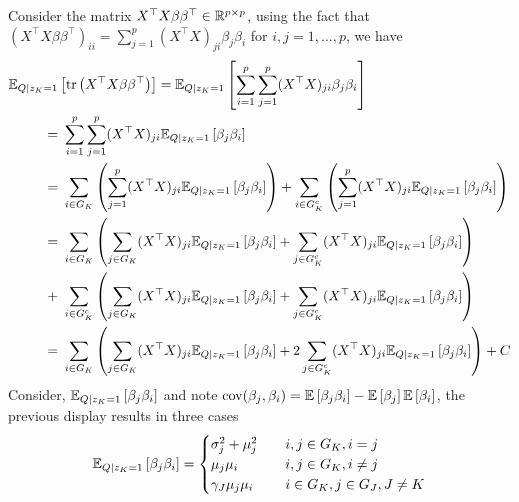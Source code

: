 \documentclass[12pt]{article}
\begin{document}
Consider the matrix $ X^\top X \beta \beta^\top \in \mathbb{R}^{p \times p} $, using the fact that $\left( X^\top X \beta \beta^\top \right)_{ii} = \sum_{j=1}^{p} (X^\top X)_{ji} \beta_j \beta_i $ for $i,j = 1, \dots, p$, we have
\begin{align}
    \E_{Q | z_K = 1} & \left[ 
	\tr \left( X^\top X \beta \beta^\top \right) 
    \right]
=
    \E_{Q | z_K = 1} \left[ 
	\sum_{i=1}^p \sum_{j=1}^{p} (X^\top X)_{ji} \beta_j \beta_i 
    \right] \nonumber \\
=&\
    \sum_{i=1}^p \sum_{j=1}^{p} (X^\top X)_{ji} 
    \E_{Q | z_K = 1} \left[ \beta_j \beta_i \right] 
    \nonumber \\
=&\
    \sum_{i \in G_K} \left(
	\sum_{j=1}^{p} (X^\top X)_{ji} 
	\E_{Q | z_K = 1} \left[ \beta_j \beta_i \right]
    \right)
+
    \sum_{i \in G_K^c} \left(
	\sum_{j=1}^{p} (X^\top X)_{ji} 
	\E_{Q | z_K = 1} \left[ \beta_j \beta_i \right] 
    \right)
    \nonumber \\
=&\
    \sum_{i \in G_K} \left( 
	\sum_{j \in G_K} (X^\top X)_{ji} 
	    \E_{Q | z_K = 1} \left[ \beta_j \beta_i \right] 
	+ 
	\sum_{j \in G_K^c} (X^\top X)_{ji} 
	    \E_{Q | z_K = 1} \left[ \beta_j \beta_i \right] 
    \right ) \nonumber \\
+&\ 
    \sum_{i \in G_K^c} \left( 
	\sum_{j \in G_K} (X^\top X)_{ji} 
	    \E_{Q | z_K = 1} \left[ \beta_j \beta_i \right] 
	+ 
	\sum_{j \in G_K^c} (X^\top X)_{ji} 
	    \E_{Q | z_K = 1} \left[ \beta_j \beta_i \right] 
    \right ) \nonumber \\
=&\
    \sum_{i \in G_K} \left( 
	\sum_{j \in G_K} (X^\top X)_{ji} 
	    \E_{Q | z_K = 1} \left[ \beta_j \beta_i \right] 
	+ 
	2 \sum_{j \in G_K^c} (X^\top X)_{ji} 
	    \E_{Q | z_K = 1} \left[ \beta_j \beta_i \right] 
    \right ) + C \nonumber
\end{align}
Consider, $ \mathbb{E}_{Q | z_K = 1} \left[ \beta_j \beta_i \right] $ and note $\operatorname{cov}(\beta_j, \beta_i) = \mathbb{E}\left[ \beta_j \beta_i \right] - \mathbb{E} \left[\beta_j \right] \mathbb{E} \left[ \beta_i \right]$, the previous display results in three cases
\begin{equation}
    \mathbb{E}_{Q | z_K = 1} \left[ \beta_j \beta_i \right] = \begin{cases}
	\sigma_{j}^2 + \mu_{j}^2 	& \quad i,j \in G_K, i=j \\
	\mu_{j}\mu_{i} 			& \quad i,j \in G_K, i \neq j \\
	\gamma_J \mu_{j}\mu_{i} 	& \quad i \in G_K, j \in G_J, J \neq K
    \end{cases}
\end{equation}
\end{document}
